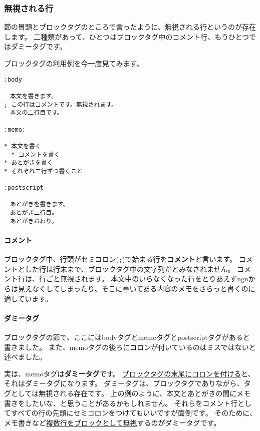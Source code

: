 \documentclass[a4j]{jsarticle}
\begin{document}
\subsubsection{無視される行}
\label{subsubsec:ignore}

節の冒頭とブロックタグのところで言ったように、無視される行というのが存在します。
二種類があって、ひとつはブロックタグ中のコメント行、もうひとつではダミータグです。

ブロックタグの利用例を今一度見てみます。

\begin{lstlisting}[caption=ブロックタグの利用例]
:body

　本文を書きます。
; この行はコメントです。無視されます。
　本文の二行目です。

:memo:

* 本文を書く
  * コメントを書く
* あとがきを書く
* それぞれ二行ずつ書くこと

:postscript

　あとがきを書きます。
　あとがき二行目。
　あとがきおわり。
\end{lstlisting}

\paragraph{コメント}

ブロックタグ中、行頭がセミコロン(\verb|;|)で始まる行を\textbf{コメント}と言います。
コメントとした行は行末まで、ブロックタグ中の文字列だとみなされません。
コメント行は、行ごと無視されます。
本文中のいらなくなった行をとりあえずngnからは見えなくしてしまったり、そこに書いてある内容のメモをさらっと書くのに適しています。

\paragraph{ダミータグ}

ブロックタグの節で、ここにはbodyタグとmemoタグとpostscriptタグがあると書きました。
また、memoタグの後ろにコロンが付いているのはミスではないと述べました。

実は、memoタグは\textbf{ダミータグ}です。
\underline{ブロックタグの末尾にコロンを付ける}と、それはダミータグになります。
ダミータグは、ブロックタグでありながら、タグとしては無視される存在です。
上の例のように、本文とあとがきの間にメモ書きをしたいな、と思うことがあるかもしれません。
それらをコメント行としてすべての行の先頭にセミコロンをつけてもいいですが面倒です。
そのために、メモ書きなど\underline{複数行をブロックとして無視}するのがダミータグです。
\end{document}
